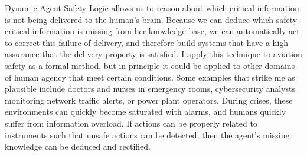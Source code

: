 Dynamic Agent Safety Logic allows us to reason about which critical information is not being delivered to the human's brain. Because we can deduce which safety-critical information is missing from her knowledge base, we can automatically act to correct this failure of delivery, and therefore build systems that have a high assurance that the delivery property is satisfied. I apply this technique to aviation safety as a formal method, but in principle it could be applied to other domains of human agency that meet certain conditions. Some examples that strike me as plausible include doctors and nurses in emergency rooms, cybersecurity analysts monitoring network traffic alerts, or power plant operators. During crises, these environments can quickly become saturated with alarms, and humans quickly suffer from information overload. If actions can be properly related to instruments such that unsafe actions can be detected, then the agent's missing knowledge can be deduced and rectified.


